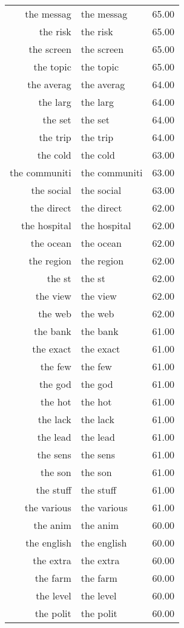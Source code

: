 \begin{table}[ht]
\begin{tabular}{rlr}
  the messag & the messag & 65.00 \\ 
  the risk & the risk & 65.00 \\ 
  the screen & the screen & 65.00 \\ 
  the topic & the topic & 65.00 \\ 
  the averag & the averag & 64.00 \\ 
  the larg & the larg & 64.00 \\ 
  the set & the set & 64.00 \\ 
  the trip & the trip & 64.00 \\ 
  the cold & the cold & 63.00 \\ 
  the communiti & the communiti & 63.00 \\ 
  the social & the social & 63.00 \\ 
  the direct & the direct & 62.00 \\ 
  the hospital & the hospital & 62.00 \\ 
  the ocean & the ocean & 62.00 \\ 
  the region & the region & 62.00 \\ 
  the st & the st & 62.00 \\ 
  the view & the view & 62.00 \\ 
  the web & the web & 62.00 \\ 
  the bank & the bank & 61.00 \\ 
  the exact & the exact & 61.00 \\ 
  the few & the few & 61.00 \\ 
  the god & the god & 61.00 \\ 
  the hot & the hot & 61.00 \\ 
  the lack & the lack & 61.00 \\ 
  the lead & the lead & 61.00 \\ 
  the sens & the sens & 61.00 \\ 
  the son & the son & 61.00 \\ 
  the stuff & the stuff & 61.00 \\ 
  the various & the various & 61.00 \\ 
  the anim & the anim & 60.00 \\ 
  the english & the english & 60.00 \\ 
  the extra & the extra & 60.00 \\ 
  the farm & the farm & 60.00 \\ 
  the level & the level & 60.00 \\ 
  the polit & the polit & 60.00 \\ 

\end{tabular}
\end{table}

